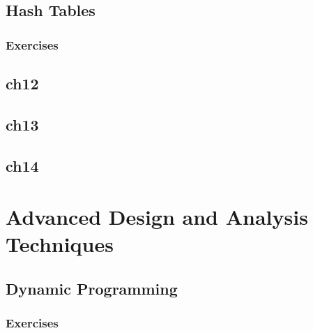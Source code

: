\documentclass[a4paper, 11pt, fleqn]{report}
\begin{document}
        \chapter{Hash Tables}
            \section*{Exercises}
                
                
        \chapter{ch12}
        \chapter{ch13}
        \chapter{ch14}
    \part{Advanced Design and Analysis Techniques}
        \chapter{Dynamic Programming}
            \section*{Exercises}
                
\end{document}
